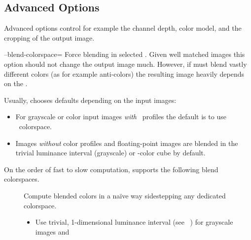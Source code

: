 

\subsection[Advanced Options\commonpart]{\label{sec:advanced-options}%
  Advanced Options\commonpart}

Advanced options control for example the channel depth, color model, and the cropping of the
output image.

\begin{codelist}
  \label{opt:blend-colorspace}%
\item[--blend-colorspace=\metavar{COLORSPACE}]\itemend
  Force blending in selected .  Given well matched images this option should
  not change the output image much.  However, if \App{} must blend vastly different colors (as
  for example anti-colors) the resulting image heavily depends on the .

  Usually, \App{} chooses defaults depending on the input images:

  \begin{itemize}
  \item
    For grayscale or color input images \emph{with} ~profiles the default is to use
    ~colorspace.

  \item
    Images \emph{without} color profiles and floating-point images are blended in the trivial
    luminance interval (grayscale) or -color cube by default.
  \end{itemize}

  On the order of fast to slow computation, \App{} supports the following blend colorspaces.

  \begin{description}
  \item[]\itemend
    Compute blended colors in a na\"ive way sidestepping any dedicated colorspace.
    \begin{itemize}
    \item
      Use trivial, 1-dimensional luminance interval (see
      \equationabbr~) for grayscale images and


\end{itemize}
\end{description}
\end{codelist}
